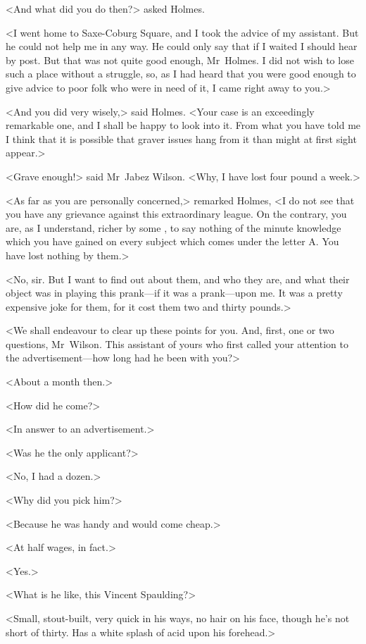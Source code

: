 <And what did you do then?> asked Holmes.

<I went home to Saxe-Coburg Square, and I took the advice of my assistant. But he could not help me in any way. He could only say that if I waited I should hear by post. But that was not quite good enough, Mr~Holmes. I did not wish to lose such a place without a struggle, so, as I had heard that you were good enough to give advice to poor folk who were in need of it, I came right away to you.>

<And you did very wisely,> said Holmes. <Your case is an exceedingly remarkable one, and I shall be happy to look into it. From what you have told me I think that it is possible that graver issues hang from it than might at first sight appear.>

<Grave enough!> said Mr~Jabez Wilson. <Why, I have lost four pound a week.>

<As far as you are personally concerned,> remarked Holmes, <I do not see that you have any grievance against this extraordinary league. On the contrary, you are, as I understand, richer by some , to say nothing of the minute knowledge which you have gained on every subject which comes under the letter A\@. You have lost nothing by them.>

<No, sir. But I want to find out about them, and who they are, and what their object was in playing this prank—if it was a prank—upon me. It was a pretty expensive joke for them, for it cost them two and thirty pounds.>

<We shall endeavour to clear up these points for you. And, first, one or two questions, Mr~Wilson. This assistant of yours who first called your attention to the advertisement—how long had he been with you?>

<About a month then.>

<How did he come?>

<In answer to an advertisement.>

<Was he the only applicant?>

<No, I had a dozen.>

<Why did you pick him?>

<Because he was handy and would come cheap.>

<At half wages, in fact.>

<Yes.>

<What is he like, this Vincent Spaulding?>

<Small, stout-built, very quick in his ways, no hair on his face, though he's not short of thirty. Has a white splash of acid upon his forehead.>

